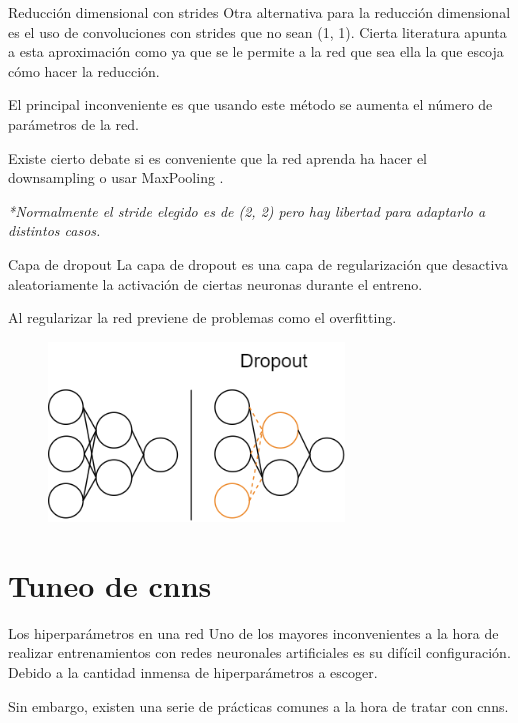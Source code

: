 \begin{frame}{Reducción dimensional con strides}
Otra \alert{alternativa} para la reducción dimensional es el uso de convoluciones con \alert{strides} que no sean (1, 1). Cierta literatura apunta a esta aproximación como  ya que se le permite a la \alert{red} que sea ella la que escoja \alert{cómo hacer} la reducción.

El principal \alert{inconveniente} es que usando este método se aumenta el número de parámetros de la red.

Existe cierto debate si es conveniente que la red \alert{aprenda} ha hacer el downsampling \cite{MaxPoolingvsStrides} o usar MaxPooling \cite{sun2018fishnet}.

\textit{*Normalmente el stride elegido es de (2, 2) pero hay libertad para adaptarlo a distintos casos.}
\end{frame}

\begin{frame}{Capa de dropout}
La capa de \alert{dropout} es una capa de \alert{regularización} que \alert{desactiva aleatoriamente} la activación de ciertas \alert{neuronas} durante el entreno.

Al regularizar la red previene de problemas como el \alert{overfitting}.

\begin{figure}
    \centering
    \includegraphics[width=0.7\textwidth]{Slides/figures/Tema 3/Dropout.png}
\end{figure}
\end{frame}

\section{Tuneo de \glspl{cnn}}

\begin{frame}{Los hiperparámetros en una red}
Uno de los mayores \alert{inconvenientes} a la hora de realizar entrenamientos con redes neuronales artificiales es su \alert{difícil configuración}. Debido a la cantidad inmensa de \alert{hiperparámetros} a escoger.

Sin embargo, existen una serie de \alert{prácticas comunes} a la hora de tratar con \glspl{cnn}.
\end{frame}

